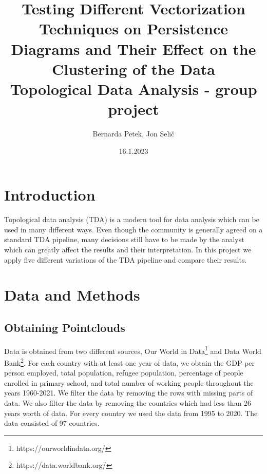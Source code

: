 \documentclass[12pt]{article}
\begin{document}
	
	
	
	
	\title{Testing Different Vectorization Techniques on Persistence Diagrams and Their Effect on the Clustering of the Data \\   \large  Topological Data Analysis - group project}
	\author{%
		Bernarda Petek, Jon Selič} %
	
	\date{16.1.2023}
	\maketitle
	
	
	
\section{Introduction}
Topological data analysis (TDA) is a modern tool for data analysis which can be used in many different ways. Even though the community is generally agreed on a standard TDA pipeline, many decisions still have to be made by the analyst which can greatly affect the results and their interpretation.\cite{wu2021topological} In this project we apply five different variations of the TDA pipeline and compare their results.

\section{Data and Methods}
\subsection{Obtaining Pointclouds}
Data is obtained from two different sources, Our World in Data\footnote{https://ourworldindata.org/} and Data World Bank\footnote{https://data.worldbank.org/}. For each country with at least one year of data, we obtain the GDP per person employed, total population, refugee population, percentage of people enrolled in primary school, and total number of working people throughout the years 1960-2021. We filter the data by removing the rows with missing parts of data. We also filter the data by removing the countries which had less than 26 years worth of data. For every country we used the data from 1995 to 2020. The data consisted of 97 countries.
\end{document}
